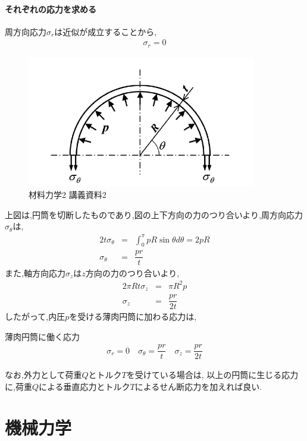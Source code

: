 \documentclass[a4paper]{jsarticle}
\begin{document}
\subsection{それぞれの応力を求める}
周方向応力$\sigma_r$は近似が成立することから,
\begin{eqnarray*}
    \sigma_r=0
\end{eqnarray*}
\begin{figure}[htbp]
    \begin{center}
        \includegraphics[width=100mm]{images/zairiki_image2.jpg}
        \caption{材料力学2 講義資料2}
    \end{center}
\end{figure}
上図は,円筒を切断したものであり,図の上下方向の力のつり合いより,周方向応力$\sigma_\theta$は,
\begin{eqnarray*}
    \displaystyle
    2t\sigma_\theta &=& \int^\pi_0 pR\sin\theta d\theta = 2pR\\
    \sigma_\theta &=&\dfrac{pr}{t}
\end{eqnarray*}
また,軸方向応力$\sigma_z$は$z$方向の力のつり合いより,
\begin{eqnarray*}
    2\pi Rt \sigma_z&=& \pi R^2p\\
    \sigma_z&=&\dfrac{pr}{2t}
\end{eqnarray*}
したがって,内圧$p$を受ける薄肉円筒に加わる応力は,
\begin{itembox}[l]{薄肉円筒に働く応力}
    \begin{eqnarray*}
        \sigma_r=0\quad
        \sigma_\theta =\dfrac{pr}{t}\quad
        \sigma_z=\dfrac{pr}{2t}
    \end{eqnarray*}
\end{itembox}
なお,外力として荷重$Q$とトルク$T$を受けている場合は,
以上の円筒に生じる応力に,荷重$Q$による垂直応力とトルク$T$によるせん断応力を加えれば良い.

\part{機械力学}
\end{document}
